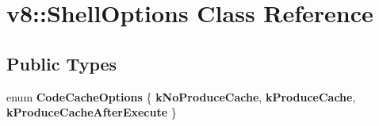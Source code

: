 \hypertarget{classv8_1_1ShellOptions}{}\section{v8\+:\+:Shell\+Options Class Reference}
\label{classv8_1_1ShellOptions}
\subsection*{Public Types}
\begin{DoxyCompactItemize}
\item 
\mbox{\label{classv8_1_1ShellOptions_a38ba14acf737feba62acfc9183bacd81}} 
enum {\bfseries Code\+Cache\+Options} \{ {\bfseries k\+No\+Produce\+Cache}, 
{\bfseries k\+Produce\+Cache}, 
{\bfseries k\+Produce\+Cache\+After\+Execute}
 \}
\end{DoxyCompactItemize}
